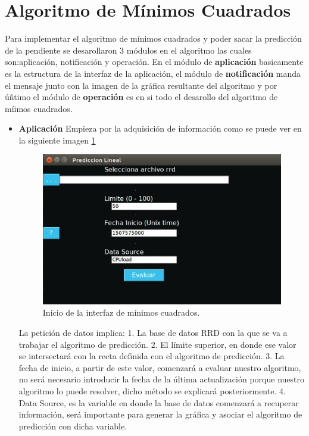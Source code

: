 \section{Algoritmo de Mínimos Cuadrados}
Para implementar el algoritmo de mínimos cuadrados y poder sacar la predicción de la pendiente se desarollaron 3 módulos en el algoritmo las cuales son:aplicación, notificación y operación.
En el módulo de \textbf{aplicación} basicamente es la estructura de la interfaz de la aplicación, el módulo de \textbf{notificación} manda el mensaje junto con la imagen de la gráfica resultante del algoritmo y por úñtimo el módulo de \textbf{operación} es en si todo el desarollo del algoritmo de míimos cuadrados. 

\begin{itemize}
\item \textbf{Aplicación} 
Empieza por la adquisición de información como se puede ver en la siguiente imagen         \ref{image:1}

\FloatBarrier
\begin{figure}[htbp!]
		\centering
		    \includegraphics[width=.6 \textwidth]{../images/1.jpeg} 
		\caption{Inicio de la interfaz de mínimos cuadrados.}
		\label{image:1}
\end{figure}
\FloatBarrier

La petición de datos implica:
1. La base de datos RRD con la que se va a trabajar el algoritmo de predicción.
2. El límite superior, en donde ese valor se intersectará con la recta definida con el algoritmo de predicción.
3. La fecha de inicio, a partir de este valor, comenzará a evaluar nuestro algoritmo, no será necesario introducir la fecha de la última actualización porque nuestro algoritmo lo puede resolver, dicho método se explicará posteriormente.
4. Data Source, es la variable en donde la base de datos comenzará a recuperar información, será importante para generar la gráfica y asociar el algoritmo de predicción con dicha variable.


\end{itemize}
